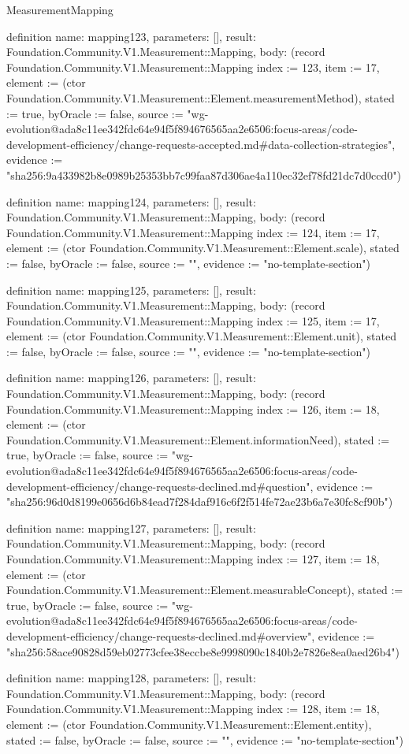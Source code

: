 \begin{lexlean}{MeasurementMapping}
\begin{semanticmodule}
definition{
  name: mapping123,
  parameters: [],
  result: Foundation.Community.V1.Measurement::Mapping,
  body: (record Foundation.Community.V1.Measurement::Mapping {index := 123, item := 17, element := (ctor Foundation.Community.V1.Measurement::Element.measurementMethod), stated := true, byOracle := false, source := "wg-evolution@ada8c11ee342fdc64e94f5f894676565aa2e6506:focus-areas/code-development-efficiency/change-requests-accepted.md#data-collection-strategies", evidence := "sha256:9a433982b8e0989b25353bb7c99faa87d306ae4a110ec32ef78fd21dc7d0ccd0"})
}

definition{
  name: mapping124,
  parameters: [],
  result: Foundation.Community.V1.Measurement::Mapping,
  body: (record Foundation.Community.V1.Measurement::Mapping {index := 124, item := 17, element := (ctor Foundation.Community.V1.Measurement::Element.scale), stated := false, byOracle := false, source := "", evidence := "no-template-section"})
}

definition{
  name: mapping125,
  parameters: [],
  result: Foundation.Community.V1.Measurement::Mapping,
  body: (record Foundation.Community.V1.Measurement::Mapping {index := 125, item := 17, element := (ctor Foundation.Community.V1.Measurement::Element.unit), stated := false, byOracle := false, source := "", evidence := "no-template-section"})
}

definition{
  name: mapping126,
  parameters: [],
  result: Foundation.Community.V1.Measurement::Mapping,
  body: (record Foundation.Community.V1.Measurement::Mapping {index := 126, item := 18, element := (ctor Foundation.Community.V1.Measurement::Element.informationNeed), stated := true, byOracle := false, source := "wg-evolution@ada8c11ee342fdc64e94f5f894676565aa2e6506:focus-areas/code-development-efficiency/change-requests-declined.md#question", evidence := "sha256:96d0d8199e0656d6b84ead7f284daf916c6f2f514fe72ae23b6a7e30fc8cf90b"})
}

definition{
  name: mapping127,
  parameters: [],
  result: Foundation.Community.V1.Measurement::Mapping,
  body: (record Foundation.Community.V1.Measurement::Mapping {index := 127, item := 18, element := (ctor Foundation.Community.V1.Measurement::Element.measurableConcept), stated := true, byOracle := false, source := "wg-evolution@ada8c11ee342fdc64e94f5f894676565aa2e6506:focus-areas/code-development-efficiency/change-requests-declined.md#overview", evidence := "sha256:58ace90828d59eb02773cfee38eccbe8e9998090c1840b2e7826e8ea0aed26b4"})
}

definition{
  name: mapping128,
  parameters: [],
  result: Foundation.Community.V1.Measurement::Mapping,
  body: (record Foundation.Community.V1.Measurement::Mapping {index := 128, item := 18, element := (ctor Foundation.Community.V1.Measurement::Element.entity), stated := false, byOracle := false, source := "", evidence := "no-template-section"})
}


\end{semanticmodule}
\end{lexlean}
